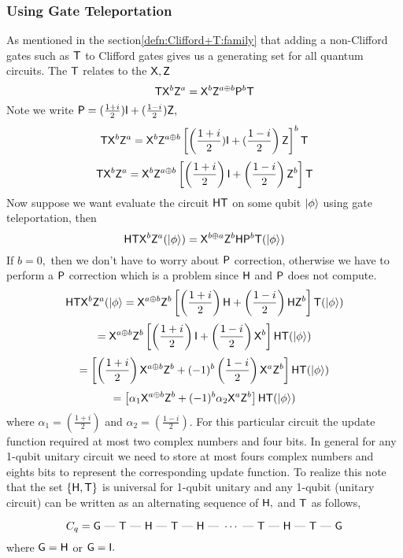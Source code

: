 \subsubsection{Using Gate Teleportation}
As mentioned in the section\ref{defn:Clifford+T:family} that adding a non-Clifford gates  such as ${\sf T}$ to Clifford gates gives us a generating set for all quantum circuits. The ${\sf T}$ relates to the ${\sf X}, {\sf Z}$
$${\sf T} {\sf X}^b {\sf Z}^a={\sf X}^b {\sf Z}^{a\oplus b}{\sf P}^b {\sf T}$$
Note we write ${\sf P}=(\frac{1+i}{2}) {\sf I} + (\frac{1-i}{2}){\sf Z},$
$${\sf T} {\sf X}^b {\sf Z}^a={\sf X}^b {\sf Z}^{a\oplus b}\left[\left(\frac{1+i}{2}) {\sf I} + (\frac{1-i}{2}\right){\sf Z}\right]^b {\sf T}$$
$${\sf T} {\sf X}^b {\sf Z}^a={\sf X}^b {\sf Z}^{a\oplus b}\left[\left(\frac{1+i}{2}\right) {\sf I} + \left(\frac{1-i}{2}\right){\sf Z}^b\right] {\sf T}$$
Now suppose we  want evaluate the circuit ${\sf H} {\sf T}$ on some qubit ${\lvert}\phi\rangle$ using gate teleportation, then
 $${\sf H} {\sf T} {\sf X}^b {\sf Z}^a ({\lvert}\phi\rangle) = {\sf X}^{b\oplus a} {\sf Z}^b {\sf H} {\sf P}^b {\sf T}({\lvert}\phi\rangle)$$
 If $b=0,$ then we don't have to worry about ${\sf P}$ correction, otherwise we have to perform a ${\sf P}$ correction which is a problem since  ${\sf H}$ and ${\sf P}$ does not compute.
 $${\sf H} {\sf T} {\sf X}^b {\sf Z}^a ({\lvert}\phi\rangle={\sf X}^{a\oplus b} {\sf Z}^b  \left[\left(\frac{1+i}{2}\right) {\sf H} + \left(\frac{1-i}{2}\right){\sf H}{\sf Z}^b\right] {\sf T}({\lvert}\phi\rangle)$$
$$= {\sf X}^{a\oplus b} {\sf Z}^b  \left[\left(\frac{1+i}{2}\right) {\sf I} + \left(\frac{1-i}{2}\right){\sf X}^b\right] {\sf H}{\sf T}({\lvert}\phi\rangle)$$
$$=\left[\left(\frac{1+i}{2}\right){\sf X}^{a\oplus b} {\sf Z}^b  + (-1)^b\left(\frac{1-i}{2}\right)  {\sf X}^{a} {\sf Z}^b\right]{\sf H}{\sf T}({\lvert}\phi\rangle)$$
$$=\left[\alpha_1{\sf X}^{a\oplus b} {\sf Z}^b  + (-1)^b\alpha_2  {\sf X}^{a} {\sf Z}^b\right]{\sf H}{\sf T}({\lvert}\phi\rangle)$$
 where $\alpha_1=\left(\frac{1+i}{2}\right)$ and $\alpha_2=\left(\frac{1-i}{2}\right).$ For this particular circuit the update function required at most two complex numbers and four bits.
 In general for any 1-qubit  unitary circuit we need to store at most fours complex numbers and eights bits to represent the corresponding update function. To realize this note that the set $\{{\sf H},  {\sf T}\}$ is universal for 1-qubit unitary and any 1-qubit (unitary circuit) can be written as an alternating sequence of ${\sf H},$ and ${\sf T}$ as follows,

 $$C_q=\textsf{G}\mbox{ --- }{\sf T} \mbox{ --- } {\sf H} \mbox{ --- } {\sf T} \mbox{ --- } {\sf H} \mbox{ --- } \cdots \mbox{ --- } {\sf T} \mbox{ --- } {\sf H} \mbox{ --- } {\sf T} \mbox{ --- } \textsf{G}$$
  where $\textsf{G}={\sf H}$ or $\textsf{G}={\sf I}.$

